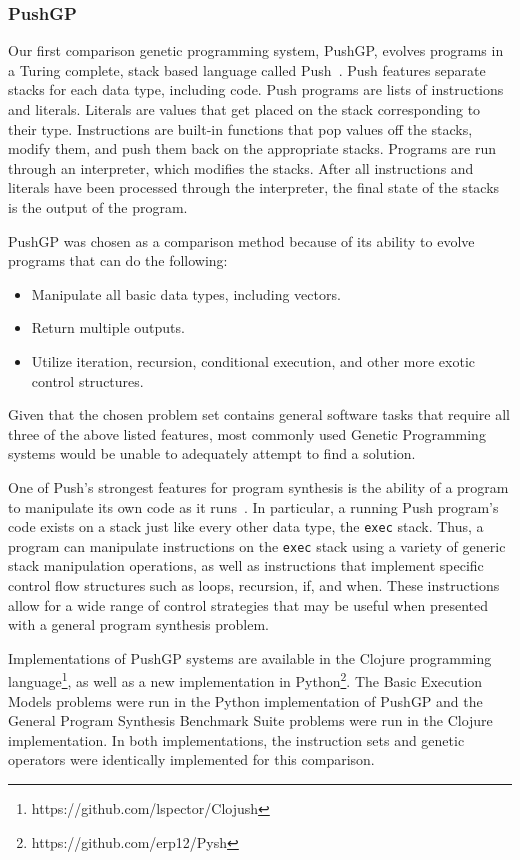\subsubsection{PushGP}

Our first comparison genetic programming system, PushGP, evolves programs in a Turing complete, stack based language called Push~\cite{Spector2002, Spector2005}. Push features separate stacks for each data type, including code. Push programs are lists of instructions and literals. Literals are values that get placed on the stack corresponding to their type. Instructions are built-in functions that pop values off the stacks, modify them, and push them back on the appropriate stacks. Programs are run through an interpreter, which modifies the stacks. After all instructions and literals have been processed through the interpreter, the final state of the stacks is the output of the program.

PushGP was chosen as a comparison method because of its ability to evolve programs that can do the following:
\begin{itemize}
\item Manipulate all basic data types, including vectors.
\item Return multiple outputs.
\item Utilize iteration, recursion, conditional execution, and other more exotic control structures.
\end{itemize}
Given that the chosen problem set contains general software tasks that require all three of the above listed features, most commonly used Genetic Programming systems would be unable to adequately attempt to find a solution.

One of Push's strongest features for program synthesis is the ability of a program to manipulate its own code as it runs~\cite{Spector2005}. In particular, a running Push program's code exists on a stack just like every other data type, the \texttt{exec} stack. Thus, a program can manipulate instructions on the \texttt{exec} stack using a variety of generic stack manipulation operations, as well as instructions that implement specific control flow structures such as loops, recursion, if, and when. These instructions allow for a wide range of control strategies that may be useful when presented with a general program synthesis problem.

Implementations of PushGP systems are available in the Clojure programming language\footnote{https://github.com/lspector/Clojush}, as well as a new implementation in Python\footnote{https://github.com/erp12/Pysh}. The Basic Execution Models problems were run in the Python implementation of PushGP and the General Program Synthesis Benchmark Suite problems were run in the Clojure implementation. In both implementations, the instruction sets and genetic operators were identically implemented for this comparison.

